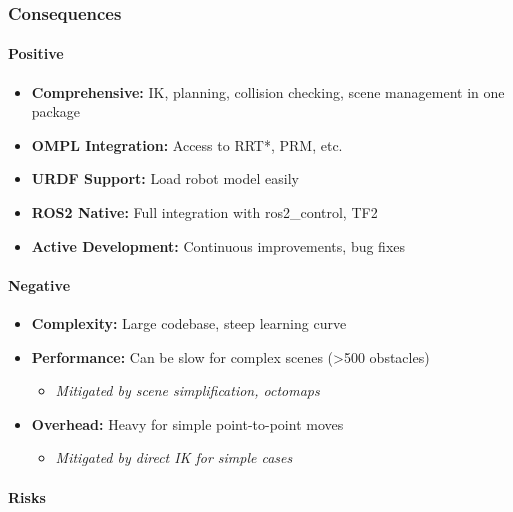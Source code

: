\documentclass[
]{article}
\providecommand{\tightlist}{%
  \setlength{\itemsep}{0pt}\setlength{\parskip}{0pt}}
\begin{document}
\hypertarget{consequences-3}{%
\subsubsection{Consequences}\label{consequences-3}}

\hypertarget{positive-3}{%
\paragraph{Positive}\label{positive-3}}

\begin{itemize}
\tightlist
\item
  \textbf{Comprehensive:} IK, planning, collision checking, scene
  management in one package
\item
  \textbf{OMPL Integration:} Access to RRT*, PRM, etc.
\item
  \textbf{URDF Support:} Load robot model easily
\item
  \textbf{ROS2 Native:} Full integration with ros2\_control, TF2
\item
  \textbf{Active Development:} Continuous improvements, bug fixes
\end{itemize}

\hypertarget{negative-3}{%
\paragraph{Negative}\label{negative-3}}

\begin{itemize}
\tightlist
\item
  \textbf{Complexity:} Large codebase, steep learning curve
\item
  \textbf{Performance:} Can be slow for complex scenes (\textgreater500
  obstacles)

  \begin{itemize}
  \tightlist
  \item
    \emph{Mitigated by scene simplification, octomaps}
  \end{itemize}
\item
  \textbf{Overhead:} Heavy for simple point-to-point moves

  \begin{itemize}
  \tightlist
  \item
    \emph{Mitigated by direct IK for simple cases}
  \end{itemize}
\end{itemize}

\hypertarget{risks-3}{%
\paragraph{Risks}\label{risks-3}}
\end{document}
